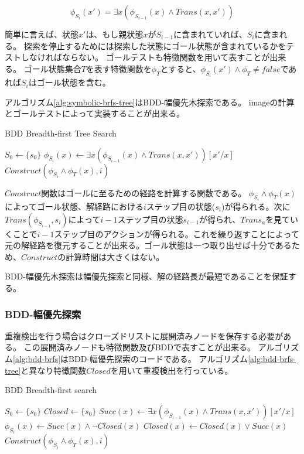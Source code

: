 \documentclass[b5paper]{report}
\begin{document}
\begin{equation}
	\phi_{S_i}(x') = \exists x (\phi_{S_{i-1}}(x) \land Trans(x,x'))
\end{equation}

簡単に言えば、状態$x'$は、もし親状態$x$が$S_{i-1}$に含まれていれば、$S_i$に含まれる。
探索を停止するためには探索した状態にゴール状態が含まれているかをテストしなければならない。
ゴールテストも特徴関数を用いて表すことが出来る。
ゴール状態集合$T$を表す特徴関数を$\phi_T$とすると、$\phi_{S_i}(x') \land \phi_T \neq false$であれば$S_i$はゴール状態を含む。

アルゴリズム\ref{alg:symbolic-brfs-tree}はBDD-幅優先木探索である。
imageの計算とゴールテストによって実装することが出来る。


\begin{algorithm}
\caption{BDD Breadth-first Tree Search}
\label{alg:bdd-brfs-tree}
	$S_0 \leftarrow \{s_0\}$\;
	 {
		$\phi_{S_i}(x) \leftarrow \exists x (\phi_{S_{i-1}}(x) \land Trans(x,x'))[x'/x]$\;
		 {
			\Return $Construct(\phi_{S_i} \land \phi_T(x), i)$\;
		}
	}
\end{algorithm}


$Construct$関数はゴールに至るための経路を計算する関数である。
$\phi_{S_i} \land \phi_T(x)$によってゴール状態、解経路における$i$ステップ目の状態($s_i$)が得られる。次に$Trans(\phi_{S_{i-1}}, s_i)$によって$i-1$ステップ目の状態$s_{i-1}$が得られ、$Trans_a$を見ていくことで$i-1$ステップ目のアクションが得られる。これを繰り返すことによって元の解経路を復元することが出来る。ゴール状態は一つ取り出せば十分であるため、$Construct$の計算時間は大きくはない。

BDD-幅優先木探索は幅優先探索と同様、解の経路長が最短であることを保証する。


\subsubsection{BDD-幅優先探索}

重複検出を行う場合はクローズドリストに展開済みノードを保存する必要がある。
この展開済みノードも特徴関数及びBDDで表すことが出来る。
アルゴリズム\ref{alg:bdd-brfs}はBDD-幅優先探索のコードである。
アルゴリズム\ref{alg:bdd-brfs-tree}と異なり特徴関数$Closed$を用いて重複検出を行っている。

\begin{algorithm}
\caption{BDD Breadth-first search}
\label{alg:bdd-brfs}
	$S_0 \leftarrow \{s_0\}$\;
	$Closed \leftarrow \{s_0\}$\;
	 {
		$Succ(x) \leftarrow \exists x (\phi_{S_{i-1}}(x) \land Trans(x,x'))[x'/x]$\;
		$\phi_{S_i}(x) \leftarrow Succ(x) \land \lnot Closed(x)$\;
		$Closed(x) \leftarrow Closed(x) \lor Succ(x)$\;
		 {
			\Return $Construct(\phi_{S_i} \land \phi_T(x), i)$\;
		}
	}
\end{algorithm}
\end{document}
